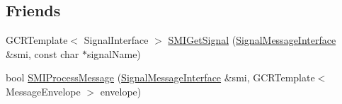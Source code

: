 \subsection*{Friends}
\begin{DoxyCompactItemize}
\item 
GCRTemplate$<$ SignalInterface $>$ \hyperlink{classSignalMessageInterface_a5ac0c04a16d02b3b32e4657030fc37a7}{SMIGetSignal} (\hyperlink{classSignalMessageInterface}{SignalMessageInterface} \&smi, const char $\ast$signalName)
\item 
bool \hyperlink{classSignalMessageInterface_ace687065e8ad1504bbfa067e025560b9}{SMIProcessMessage} (\hyperlink{classSignalMessageInterface}{SignalMessageInterface} \&smi, GCRTemplate$<$ MessageEnvelope $>$ envelope)
\end{DoxyCompactItemize}


